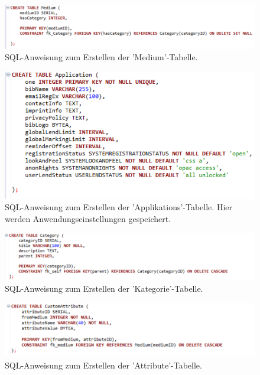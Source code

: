 \documentclass{article}
\begin{document}
\begin{figure}
\hypertarget{Medium}{}
\flushleft
\includegraphics[width=60em]{SQLMEDIUM}
\caption{SQL-Anweisung zum Erstellen der 'Medium'-Tabelle.}
\end{figure}

\begin{figure}
\hypertarget{Application}{}
\flushleft
\includegraphics[width=45em]{SQLAPPLICATION}
\caption{SQL-Anweisung zum Erstellen der 'Applikations'-Tabelle. Hier werden Anwendungseinstellungen gespeichert.}
\end{figure}

\begin{figure}
\hypertarget{Category}{}
\flushleft
\includegraphics[width=60em]{SQLCATEGORY}
\caption{SQL-Anweisung zum Erstellen der 'Kategorie'-Tabelle.}
\end{figure}

\begin{figure}
\hypertarget{CustomAttribut}{}
\flushleft
\includegraphics[width=60em]{SQLCUSTOMATTRIBUTE}
\caption{SQL-Anweisung zum Erstellen der 'Attribute'-Tabelle.}
\end{figure}
\end{document}
